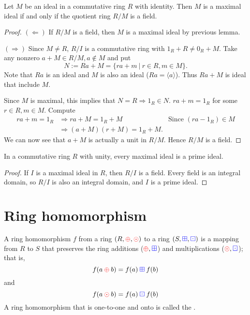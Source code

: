\begin{theorem}
    Let $M$ be an ideal in a commutative ring $R$ with identity. Then $M$ is a maximal ideal if and only if
    the quotient ring $R/M$ is a field. 
\end{theorem}
\begin{proof}
    $(\Leftarrow)$ If $R/M$ is a field, then $M$ is a maximal ideal by previous lemma.

    $(\Rightarrow)$ Since $M \neq R$, $R/I$ is a commutative ring with 
    $1_R + R \neq 0_R + M$. Take any nonzero $a + M \in R/M, a \notin M$ and put 
    \[
        N := Ra + M = \{ ra+m \> | \> r \in R, m \in M \}.
    \]
    Note that $Ra$ is an ideal and $M$ is also an ideal ($Ra = \langle a \rangle$). 
    Thus $Ra + M$ is ideal that include $M$.

    Since $M$ is maximal, this implies that $N = R \Longrightarrow 1_R \in N$. 
    $ra + m = 1_R$ for some $r \in R, m \in M$. Compute 
    \begin{align*}
        ra + m = 1_R &\Rightarrow ra + M = 1_R + M & \text{Since } (ra-1_R) \in M\\
        &\Rightarrow (a+M)(r+M) = 1_R + M.
    \end{align*}
    We can now see that $a+M$ is actually a unit in $R/M$. Hence $R/M$ is a field.
\end{proof}

\begin{corollary}
    In a commutative ring $R$ with unity, every maximal ideal is a prime ideal.
\end{corollary}
\begin{proof}
    If $I$ is a maximal ideal in $R$, then $R/I$ is a field. Every field is an integral domain, so $R/I$ is 
    also an integral domain, and $I$ is a prime ideal.
\end{proof}

\section{Ring homomorphism}

\begin{definition}
    A ring homomorphism $f$ from a ring $(R, {\color{red} \oplus}, {\color{red} \odot})$ to a ring 
    $(S, {\color{blue} \boxplus}, {\color{blue} \boxdot})$ is a mapping from $R$ to $S$ that preserves the 
    ring additions (${\color{red} \oplus}, {\color{blue} \boxplus}$) and multiplications (${\color{red} \odot}, {\color{blue} \boxdot}$); that is, 
    \begin{equation*}
        f(a \> {\color{red} \oplus} \> b) = f(a) \> {\color{blue} \boxplus} \> f(b) 
    \end{equation*}
    and 
    \begin{equation*}
        f(a \> {\color{red} \odot} \> b) = f(a) \> {\color{blue} \boxdot} \> f(b) 
    \end{equation*}
    A ring homomorphism that is one-to-one and onto is called the .
\end{definition}

